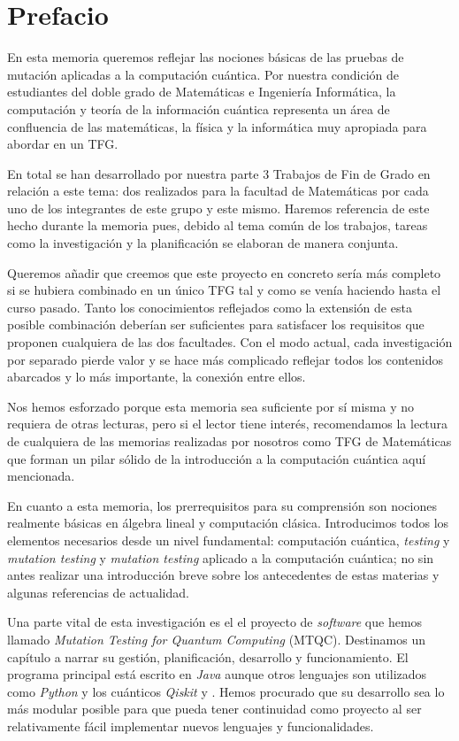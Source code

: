 \chapter*{Prefacio}

En esta memoria queremos reflejar las nociones básicas de las pruebas de mutación aplicadas a la computación cuántica. Por nuestra condición de estudiantes del doble grado de Matemáticas e Ingeniería Informática, la computación y teoría de la información cuántica representa un área de confluencia de las matemáticas, la física y la informática muy apropiada para abordar en un TFG.

En total se han desarrollado por nuestra parte 3 Trabajos de Fin de Grado en relación a este tema: dos realizados para la facultad de Matemáticas por cada uno de los integrantes de este grupo y este mismo. Haremos referencia de este hecho durante la memoria pues, debido al tema común de los trabajos, tareas como la investigación y la planificación se elaboran de manera conjunta.

Queremos añadir que creemos que este proyecto en concreto sería más completo si se hubiera combinado en un único TFG tal y como se venía haciendo hasta el curso pasado. Tanto los conocimientos reflejados como la extensión de esta posible combinación deberían ser suficientes para satisfacer los requisitos que proponen cualquiera de las dos facultades. Con el modo actual, cada investigación por separado pierde valor y se hace más complicado reflejar todos los contenidos abarcados y lo más importante, la conexión entre ellos.

Nos hemos esforzado porque esta memoria sea suficiente por sí misma y no requiera de otras lecturas, pero si el lector tiene interés, recomendamos la lectura de cualquiera de las memorias realizadas por nosotros como TFG de Matemáticas que forman un pilar sólido de la introducción a la computación cuántica aquí mencionada.

En cuanto a esta memoria, los prerrequisitos para su comprensión son nociones realmente básicas en álgebra lineal y computación clásica. Introducimos todos los elementos necesarios desde un nivel fundamental: computación cuántica, \textit{testing} y \textit{mutation testing} y \textit{mutation testing} aplicado a la computación cuántica; no sin antes realizar una introducción breve sobre los antecedentes de estas materias y algunas referencias de actualidad.

Una parte vital de esta investigación es el el proyecto de \textit{software} que hemos llamado \textit{Mutation Testing for Quantum Computing} (MTQC). Destinamos un capítulo a narrar su gestión, planificación, desarrollo y funcionamiento. El programa principal está escrito en \textit{Java} aunque otros lenguajes son utilizados como \textit{Python} y los cuánticos \textit{Qiskit} y \qsh. Hemos procurado que su desarrollo sea lo más modular posible para que pueda tener continuidad como proyecto al ser relativamente fácil implementar nuevos lenguajes y funcionalidades.

